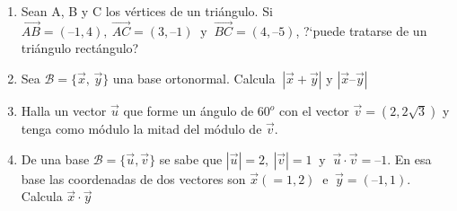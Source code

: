 \begin{enumerate}
\item	Sean A, B y C los vértices de un triángulo. Si $\overrightarrow{AB}= (–1, 4), \ \overrightarrow{AC}= (3, –1) \ \text{ y } \ \overrightarrow{BC}= (4, –5)$, ?`puede tratarse de un triángulo rectángulo?

\vspace{-6mm}
\begin{flushright}
\begin{footnotesize} \textcolor{gris}{}	\end{footnotesize}
\end{flushright}



\item	Sea $\mathcal B=\{\vec x, \, \vec y\}$ una base ortonormal. Calcula $\ |\vec x + \vec y|$  y $|\vec x – \vec y|$

\vspace{-6mm}
\begin{flushright}
\begin{footnotesize} \textcolor{gris}{}	\end{footnotesize}
\end{flushright}


\item	Halla un vector $\vec u$ que forme un ángulo de $60^o$ con el vector $\vec v=(2, 2 \sqrt{3})$ y tenga como módulo la mitad del módulo de $\vec v$.

\vspace{-6mm}
\begin{flushright}
\begin{footnotesize} \textcolor{gris}{}	\end{footnotesize}
\end{flushright}


\item	De una base $\mathcal B = \{ \vec u, \vec v\}$ se sabe que $|\vec u| = 2, \ |\vec v| = 1 \ \text{ y } \  \vec u \cdot \vec  v = –1$. En esa base las coordenadas de dos vectores son $\vec x(=1, 2) \ \text{ e } \  \vec y=(–1, 1)$. Calcula $\vec x \cdot \vec y$

\vspace{-6mm}
\begin{flushright}
\begin{footnotesize} \textcolor{gris}{}	\end{footnotesize}
\end{flushright}





\end{enumerate}
